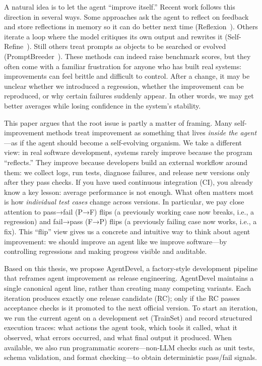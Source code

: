 \documentclass[11pt]{article}
\begin{document}
A natural idea is to let the agent “improve itself.” Recent work follows this direction in several ways. Some approaches ask the agent to reflect on feedback and store reflections in memory so it can do better next time (Reflexion~\citep{shinn2023reflexionlanguageagentsverbal}). Others iterate a loop where the model critiques its own output and rewrites it (Self-Refine~\cite{madaan2023selfrefineiterativerefinementselffeedback}). Still others treat prompts as objects to be searched or evolved (PromptBreeder~\cite{fernando2023promptbreederselfreferentialselfimprovementprompt}). These methods can indeed raise benchmark scores, but they often come with a familiar frustration for anyone who has built real systems: improvements can feel brittle and difficult to control. After a change, it may be unclear whether we introduced a regression, whether the improvement can be reproduced, or why certain failures suddenly appear. In other words, we may get better averages while losing confidence in the system’s stability.

This paper argues that the root issue is partly a matter of framing. Many self-improvement methods treat improvement as something that lives \textit{inside the agent}—as if the agent should become a self-evolving organism. We take a different view: in real software development, systems rarely improve because the program “reflects.” They improve because developers build an external workflow around them: we collect logs, run tests, diagnose failures, and release new versions only after they pass checks. If you have used continuous integration (CI), you already know a key lesson: average performance is not enough. What often matters most is how \textit{individual test cases} change across versions. In particular, we pay close attention to pass→fail (P→F) flips (a previously working case now breaks, i.e., a regression) and fail→pass (F→P) flips (a previously failing case now works, i.e., a fix). This “flip” view gives us a concrete and intuitive way to think about agent improvement: we should improve an agent like we improve software—by controlling regressions and making progress visible and auditable.

Based on this thesis, we propose AgentDevel, a factory-style development pipeline that reframes agent improvement as release engineering. AgentDevel maintains a single canonical agent line, rather than creating many competing variants. Each iteration produces exactly one release candidate (RC); only if the RC passes acceptance checks is it promoted to the next official version. To start an iteration, we run the current agent on a development set (TrainSet) and record structured execution traces: what actions the agent took, which tools it called, what it observed, what errors occurred, and what final output it produced. When available, we also run programmatic scorers—non-LLM checks such as unit tests, schema validation, and format checking—to obtain deterministic pass/fail signals.
\end{document}
